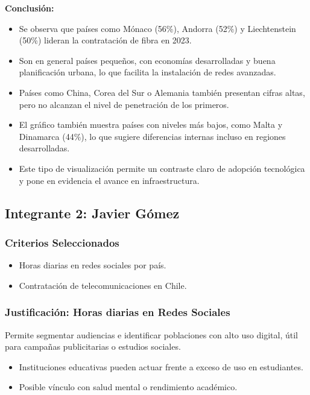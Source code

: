 \documentclass[12pt, a4paper]{article}
\begin{document}
\textbf{Conclusión:}
\begin{itemize}
    \item Se observa que países como Mónaco (56\%), Andorra (52\%) y Liechtenstein (50\%) lideran la contratación de fibra en 2023.
    \item Son en general países pequeños, con economías desarrolladas y buena planificación urbana, lo que facilita la instalación de redes avanzadas.
    \item Países como China, Corea del Sur o Alemania también presentan cifras altas, pero no alcanzan el nivel de penetración de los primeros.
    \item El gráfico también muestra países con niveles más bajos, como Malta y Dinamarca (44\%), lo que sugiere diferencias internas incluso en regiones desarrolladas.
    \item Este tipo de visualización permite un contraste claro de adopción tecnológica y pone en evidencia el avance en infraestructura.
\end{itemize}


\newpage
\subsection*{Integrante 2: Javier Gómez}

\subsubsection*{Criterios Seleccionados}
\begin{itemize}
    \item Horas diarias en redes sociales por país.
    \item Contratación de telecomunicaciones en Chile.
\end{itemize}

\subsubsection*{Justificación: Horas diarias en Redes Sociales}
Permite segmentar audiencias e identificar poblaciones con alto uso digital, útil para campañas publicitarias o estudios sociales.

\begin{itemize}
    \item Instituciones educativas pueden actuar frente a exceso de uso en estudiantes.
    \item Posible vínculo con salud mental o rendimiento académico.
\end{itemize}
\end{document}
